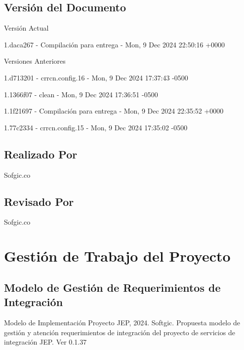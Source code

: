 \documentclass[
  paper=a4,
  ,captions=tableheading
]{scrartcl}
\renewenvironment{quote}{\begin{customblockquote}\list{}{\rightmargin=0em\leftmargin=0em}%
\item\relax\color{blockquote-text}\ignorespaces}{\unskip\unskip\endlist\end{customblockquote}}
\begin{document}
\subsection{Versión del Documento}\label{sec:versiuxf3n-del-documento}

\begin{quote}
\end{quote}

Versión Actual

1.daca267 - Compilación para entrega - Mon, 9 Dec 2024 22:50:16 +0000

Versiones Anteriores

1.d713201 - crrcn.config.16 - Mon, 9 Dec 2024 17:37:43 -0500

1.1366f07 - clean - Mon, 9 Dec 2024 17:36:51 -0500

1.1f21697 - Compilación para entrega - Mon, 9 Dec 2024 22:35:52 +0000

1.77c2334 - crrcn.config.15 - Mon, 9 Dec 2024 17:35:02 -0500

\subsection{Realizado Por}\label{sec:realizado-por}

Sofgic.co

\subsection{Revisado Por}\label{sec:revisado-por}

Sofgic.co

\newpage

\section{Gestión de Trabajo del
Proyecto}\label{sec:gestiuxf3n-de-trabajo-del-proyecto}

\subsection{Modelo de Gestión de Requerimientos de
Integración}\label{sec:modelo-de-gestiuxf3n-de-requerimientos-de-integraciuxf3n}

\begin{quote}
Modelo de Implementación Proyecto JEP, 2024. Softgic. Propuesta modelo
de gestión y atención requerimientos de integración del proyecto de
servicios de integración JEP. Ver 0.1.37
\end{quote}
\end{document}
